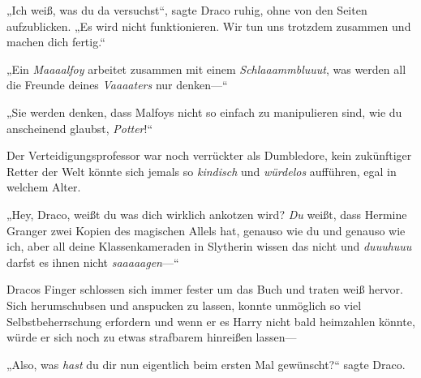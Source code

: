 „Ich weiß, was du da versuchst“, sagte Draco ruhig, ohne von den Seiten aufzublicken.
„Es wird nicht funktionieren. Wir tun uns trotzdem zusammen und machen dich fertig.“

„Ein \emph{Maaaalfoy} arbeitet zusammen mit einem \emph{Schlaaammbluuut}, was werden all die Freunde deines \emph{Vaaaaters} nur denken—“

„Sie werden denken, dass Malfoys nicht so einfach zu manipulieren sind, wie du anscheinend glaubst, \emph{Potter}!“

Der Verteidigungsprofessor war noch verrückter als Dumbledore, kein zukünftiger Retter der Welt könnte sich jemals so \emph{kindisch} und \emph{würdelos} aufführen, egal in welchem Alter.

„Hey, Draco, weißt du was dich wirklich ankotzen wird? \emph{Du} weißt, dass Hermine Granger zwei Kopien des magischen Allels hat, genauso wie du und genauso wie ich, aber all deine Klassenkameraden in Slytherin wissen das nicht und \emph{duuuhuuu} darfst es ihnen nicht \emph{saaaaagen}—“

Dracos Finger schlossen sich immer fester um das Buch und traten weiß hervor. Sich herumschubsen und anspucken zu lassen, konnte unmöglich so viel Selbstbeherrschung erfordern und wenn er es Harry nicht bald heimzahlen könnte, würde er sich noch zu etwas strafbarem hinreißen lassen—

„Also, was \emph{hast} du dir nun eigentlich beim ersten Mal gewünscht?“ sagte Draco.

